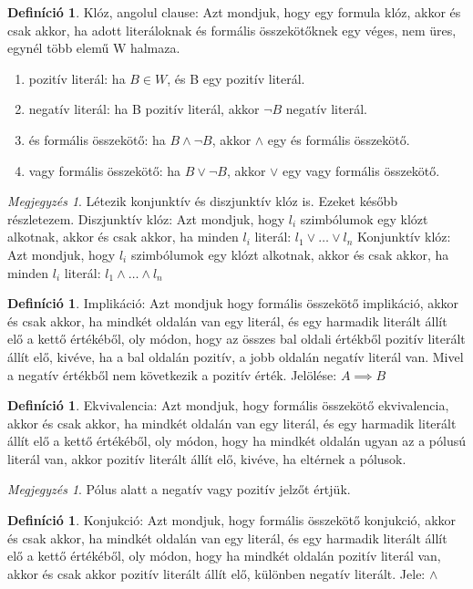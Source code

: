 \documentclass[
]{thesis-ekf}
\theoremstyle{definition}
\newtheorem{definicio}[tetel]{Definíció}
\theoremstyle{remark}
\newtheorem{megjegyzes}[tetel]{Megjegyzés}
\begin{document}
	\begin{definicio}
		Klóz, angolul clause: Azt mondjuk, hogy egy formula klóz, akkor és csak akkor, ha adott literáloknak és formális összekötőknek egy véges, nem üres, egynél több elemű W halmaza.
		\begin{enumerate}
			\item pozitív literál: ha $ B\in W $, és B egy pozitív literál.
			\item negatív literál: ha B pozitív literál, akkor $\neg B $ negatív literál.
			\item és formális összekötő: ha $ B \wedge \neg B $, akkor $\wedge$ egy és formális összekötő.
			\item vagy formális összekötő: ha $ B \vee \neg B $, akkor $\vee$ egy vagy formális összekötő.
		\end{enumerate}	
	\end{definicio}
	\begin{megjegyzes}
		Létezik konjunktív és diszjunktív klóz is. Ezeket később részletezem.
		Diszjunktív klóz: Azt mondjuk, hogy $ l_{i} $ szimbólumok egy klózt alkotnak, akkor és csak akkor, ha minden $ l_{i} $ literál: $ l_{1}\vee\dots\vee l_{n} $
		Konjunktív klóz: Azt mondjuk, hogy $ l_{i} $ szimbólumok egy klózt alkotnak, akkor és csak akkor, ha minden $ l_{i} $ literál: $ l_{1}\wedge\dots\wedge l_{n} $
	\end{megjegyzes}
	\begin{definicio}
		Implikáció: Azt mondjuk hogy formális összekötő implikáció, akkor és csak akkor, ha mindkét oldalán van egy literál, és egy harmadik literált állít elő a kettő értékéből, oly módon, hogy az összes bal oldali értékből pozitív literált állít elő, kivéve, ha a bal oldalán pozitív, a jobb oldalán negatív literál van.
		Mivel a negatív értékből nem következik a pozitív érték. Jelölése: $ A \implies B $
	\end{definicio}
	\begin{definicio}
		Ekvivalencia: Azt mondjuk, hogy formális összekötő ekvivalencia, akkor és csak akkor, ha mindkét oldalán van egy literál, és egy harmadik literált állít elő a kettő értékéből, oly módon, hogy ha mindkét oldalán ugyan az a pólusú literál van, akkor pozitív literált állít elő, kivéve, ha eltérnek a pólusok.
	\end{definicio}
	\begin{megjegyzes}
		Pólus alatt a negatív vagy pozitív jelzőt értjük.
	\end{megjegyzes}
	\begin{definicio}
		Konjukció: Azt mondjuk, hogy formális összekötő konjukció, akkor és csak akkor, ha mindkét oldalán van egy literál, és egy harmadik literált állít elő a kettő értékéből, oly módon, hogy ha mindkét oldalán pozitív literál van, akkor és csak akkor pozitív literált állít elő, különben negatív literált. Jele: $\wedge$
	\end{definicio}
\end{document}
